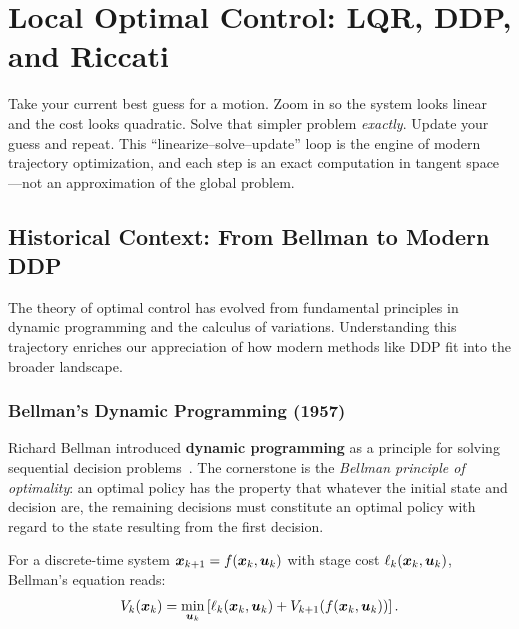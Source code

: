 \chapter{Local Optimal Control: LQR, DDP, and Riccati}
\label{ch:optimal-control}

\begin{laymansbox}
Take your current best guess for a motion. Zoom in so the system looks linear and the
cost looks quadratic. Solve that simpler problem \emph{exactly}. Update your guess and
repeat. This ``linearize--solve--update'' loop is the engine of modern trajectory
optimization, and each step is an exact computation in tangent space---not an
approximation of the global problem.
\end{laymansbox}

\section{Historical Context: From Bellman to Modern DDP}

The theory of optimal control has evolved from fundamental principles in dynamic programming and
the calculus of variations. Understanding this trajectory enriches our appreciation of how
modern methods like DDP fit into the broader landscape.

\subsection{Bellman's Dynamic Programming (1957)}

Richard Bellman introduced \textbf{dynamic programming} as a principle for solving sequential decision
problems~\cite{bellman1957}. The cornerstone is the \emph{Bellman principle of optimality}:
an optimal policy has the property that whatever the initial state and decision are, the remaining
decisions must constitute an optimal policy with regard to the state resulting from the first decision.

For a discrete-time system $\bm{x}_{k+1} = f(\bm{x}_k,\bm{u}_k)$ with stage cost $\ell_k(\bm{x}_k,\bm{u}_k)$,
Bellman's equation reads:
\begin{equation}
V_k(\bm{x}_k) = \min_{\bm{u}_k} \left[ \ell_k(\bm{x}_k,\bm{u}_k) + V_{k+1}(f(\bm{x}_k,\bm{u}_k)) \right].
\label{eq:ch5:bellman}
\end{equation}

